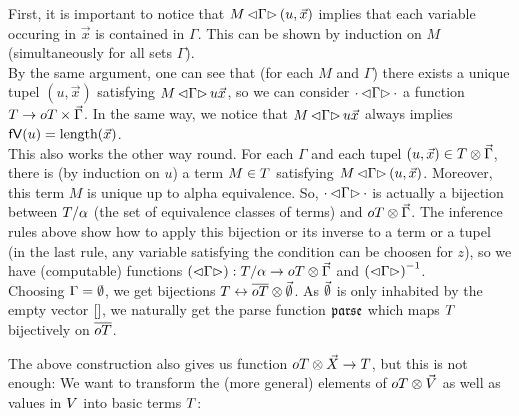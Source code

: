 \documentclass[submission,copyright,creativecommons]{eptcs}
\begin{document}
First, it is important to notice that $M \, { \mathord{\lhd} {\Gamma} \mathord{\rhd} } \, (u, \vec x)$ implies that each variable occuring in $\vec x$ is contained in $\Gamma$. This can be shown by induction on $M$ (simultaneously for all sets $\Gamma$). \\
By the same argument, one can see that (for each $M$ and $\Gamma$) there exists a unique tupel $(u, \vec x)$ satisfying $M \, { \mathord{\lhd} {\Gamma} \mathord{\rhd} } \, u  \vec x$, so we can consider $\cdot \, { \mathord{\lhd} {\Gamma} \mathord{\rhd} } \, \cdot$ a function $T \rightarrow oT \times \vec \Gamma$. In the same way, we notice that $M \, { \mathord{\lhd} {\Gamma} \mathord{\rhd} } \, u  \vec x$ always implies $\mathsf{fV}(u) = \mbox{length}(\vec x)$. \\
This also works the other way round. For each $\Gamma$ and each tupel $(u, \vec x) \in T \otimes \vec \Gamma$, there is (by induction on $u$) a term $M \in T$ satisfying $M \, { \mathord{\lhd} {\Gamma} \mathord{\rhd} } \, (u, \vec x)$. Moreover, this term $M$ is unique up to alpha equivalence. So, $\cdot \, { \mathord{\lhd} {\Gamma} \mathord{\rhd} } \, \cdot$ is actually a bijection between $T / \alpha$ (the set of equivalence classes of terms) and $oT \otimes \vec \Gamma$. The inference rules above show how to apply this bijection or its inverse to a term or a tupel (in the last rule, any variable satisfying the condition can be choosen for $z$), so we have (computable) functions $\left(\mathord{\lhd} {\Gamma} \mathord{\rhd}\right) : T / \alpha \rightarrow oT \otimes \vec \Gamma$ and $\left(\mathord{\lhd} {\Gamma} \mathord{\rhd}\right) ^{-1}$. 
\\
Choosing $\Gamma = \emptyset$, we get bijections $T \leftrightarrow \overline{oT} \otimes {\vec {\emptyset}}$. As $\vec {\emptyset}$ is only inhabited by the empty vector $[]$, we naturally get the parse function $\mathfrak {parse }$ which maps $T$ bijectively on $\overline{oT}$.



The above construction also gives us function $oT \otimes \vec {X} \rightarrow T$, but this is not enough: We want to transform the (more general) elements of $oT \otimes \vec {V}$ as well as values in $V$ into basic terms $T$:
\end{document}
